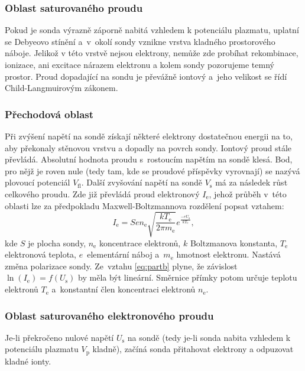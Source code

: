 \documentclass{protokol}
\newcommand\elemcharge{e}
\newcommand\boltzmann{k}
\newcommand\masselec{m_\mathrm{e}}
\newcommand\ielec{I_\mathrm{e}}
\newcommand\flpot{V_\mathrm{fl}}
\newcommand\plpot{V_\mathrm{p}}
\newcommand\potprobe{V_\mathrm{s}}
\newcommand\uprobe{U_\mathrm{s}}
\newcommand\denselec{n_\mathrm{e}}
\newcommand\probesurf{S}
\newcommand\tempelec{T_\mathrm{e}}
\begin{document}
\subsubsection{Oblast saturovaného proudu \parta}
Pokud je sonda výrazně záporně nabitá vzhledem k potenciálu plazmatu,
uplatní se Debyeovo stínění a~v~okolí sondy vznikne vrstva kladného
prostorového náboje.
Jelikož v této vrstvě nejsou elektrony, nemůže zde probíhat rekombinace,
ionizace, ani excitace nárazem elektronu a kolem sondy pozorujeme temný prostor.
Proud dopadající na sondu je převážně iontový
a~jeho velikost se řídí Child-Langmuirovým zákonem.

\subsubsection{Přechodová oblast \partb}
Při zvýšení napětí na sondě získají některé elektrony dostatečnou energii na to,
aby překonaly stěnovou vrstvu a dopadly na povrch sondy.
Iontový proud stále převládá.
Absolutní hodnota proudu s~rostoucím napětím na sondě klesá.
Bod, pro nějž je roven nule (tedy tam, kde se proudové příspěvky vyrovnají)
se nazývá plovoucí potenciál $\flpot$.
Další zvyšování napětí na sondě $\potprobe$ má za následek růst celkového proudu.
Zde již převládá proud elektronový $\ielec$, jehož průběh v~této oblasti lze
za předpokladu Maxwell-Boltzmannova rozdělení popsat vztahem:
\begin{equation}
	\label{eq:partb}
	\ielec = \probesurf \elemcharge \denselec
		\sqrt{\frac{\boltzmann \tempelec}{2 \pi \masselec}}
		e^{\frac{-\elemcharge\uprobe}{\boltzmann \tempelec}},
\end{equation}
kde $\probesurf$ je plocha sondy, $\denselec$ koncentrace elektronů,
$\boltzmann$ Boltzmanova konstanta, $\tempelec$ elektronová teplota,
$\elemcharge$~elementární náboj a~$\masselec$ hmotnost elektronu.
Nastává změna polarizace sondy.
Ze~vztahu \eqref{eq:partb} plyne,
že závislost $\ln(\ielec)=f(\uprobe)$ by měla být lineární.
Směrnice přímky potom určuje teplotu elektronů $\tempelec$
a~konstantní člen koncentraci elektronů $\denselec$.

\subsubsection{Oblast saturovaného elektronového proudu \partc}
Je-li překročeno nulové napětí $\uprobe$ na sondě
(tedy je-li sonda nabita vzhledem k potenciálu plazmatu $\plpot$ kladně),
začíná sonda přitahovat elektrony a odpuzovat kladné ionty.
\end{document}
